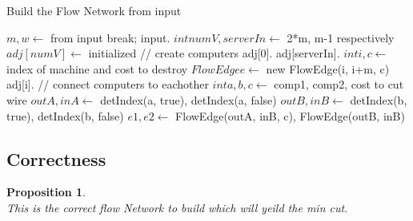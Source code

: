 \documentclass[12pt]{article}
\newtheorem{proposition}[theorem]{Proposition}
\begin{document}
\begin{algorithm}[H]
\caption{Build the Flow Network from input}
\begin{algorithmic}
            \State $m, w \gets$ from input
                break;
            \EndIf
                \State {}
                    input.
                \EndFor
            \EndIf
            \State $int numV,serverIn \gets$ 2*m, m-1 respectively
            \State $adj[numV] \gets$ initialized
            \State // create computers
            \State adj[0].
            \State adj[serverIn].
                \State $int i, c \gets$ index of machine and cost to destroy
                \State $FlowEdge e \gets$ new FlowEdge(i, i+m, c)
                \State adj[i].
            \EndFor
            \State // connect computers to eachother
                \State $int a, b, c \gets$ comp1, comp2, cost to cut wire
                \State $outA, inA \gets$ detIndex(a, true), detIndex(a, false)
                \State $outB, inB \gets$ detIndex(b, true), detIndex(b, false)
                \State $e1, e2 \gets$ FlowEdge(outA, inB, c), FlowEdge(outB, inB)
            \EndFor
            \State {}
        \EndWhile
    \EndProcedure
\end{algorithmic}
\end{algorithm}


\subsection{Correctness}
\begin{proposition}
~ \\ \indent This is the correct flow Network to build which will yeild the min cut.
\end{proposition}
\end{document}
